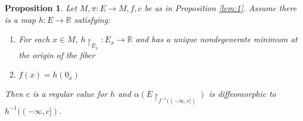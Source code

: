 \documentclass{article}
\newtheorem{prop}{Proposition}
\begin{document}
\begin{prop}

Let $M, \pi:E \to M, f, c$ be as in Proposition \ref{lem:1}. Assume there is a map $h:E \to \mathbb{R}$ satisfying:
\begin{enumerate}
    \item For each $x \in M$, $h \restriction_{E_x}: E_x \to \mathbb{R}$ and has a unique nondegenerate minimum at the origin of the fiber
    \item $f(x) = h(0_x)$
\end{enumerate}
\indent Then $c$ is a regular value for $h$ and $\alpha( E \restriction_{f^{-1}((-\infty,c])})$ is diffeomorphic to $h^{-1}((-\infty,c])$.
\end{prop}
\end{document}
